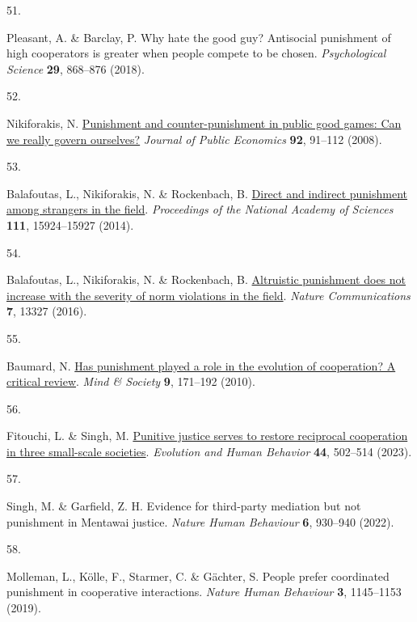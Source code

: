 \documentclass[
  man,floatsintext]{apa6}
\newlength{\cslhangindent}
\newlength{\csllabelwidth}
\newlength{\cslentryspacingunit} %
\newenvironment{CSLReferences}[2] %
 {%
  \setlength{\parindent}{0pt}
  \ifodd #1
  \let\oldpar\par
  \def\par{\hangindent=\cslhangindent\oldpar}
  \fi
  \setlength{\parskip}{#2\cslentryspacingunit}
 }%
 {}
\newcommand{\CSLLeftMargin}[1]{\parbox[t]{\csllabelwidth}{#1}}
\newcommand{\CSLRightInline}[1]{\parbox[t]{\linewidth - \csllabelwidth}{#1}\break}
\begin{document}
\begin{CSLReferences}{0}{0}
\leavevmode{}%
\CSLLeftMargin{51. }%
\CSLRightInline{Pleasant, A. \& Barclay, P. Why hate the good guy? Antisocial punishment of high cooperators is greater when people compete to be chosen. \emph{Psychological Science} \textbf{29}, 868--876 (2018).}

\leavevmode{}%
\CSLLeftMargin{52. }%
\CSLRightInline{Nikiforakis, N. \href{https://doi.org/10.1016/j.jpubeco.2007.04.008}{Punishment and counter-punishment in public good games: Can we really govern ourselves?} \emph{Journal of Public Economics} \textbf{92}, 91--112 (2008).}

\leavevmode{}%
\CSLLeftMargin{53. }%
\CSLRightInline{Balafoutas, L., Nikiforakis, N. \& Rockenbach, B. \href{https://doi.org/10.1073/pnas.1413170111}{Direct and indirect punishment among strangers in the field}. \emph{Proceedings of the National Academy of Sciences} \textbf{111}, 15924--15927 (2014).}

\leavevmode{}%
\CSLLeftMargin{54. }%
\CSLRightInline{Balafoutas, L., Nikiforakis, N. \& Rockenbach, B. \href{https://doi.org/10.1038/ncomms13327}{Altruistic punishment does not increase with the severity of norm violations in the field}. \emph{Nature Communications} \textbf{7}, 13327 (2016).}

\leavevmode{}%
\CSLLeftMargin{55. }%
\CSLRightInline{Baumard, N. \href{https://doi.org/10.1007/s11299-010-0079-9}{Has punishment played a role in the evolution of cooperation? A critical review}. \emph{Mind \& Society} \textbf{9}, 171--192 (2010).}

\leavevmode{}%
\CSLLeftMargin{56. }%
\CSLRightInline{Fitouchi, L. \& Singh, M. \href{https://doi.org/10.1016/j.evolhumbehav.2023.03.001}{Punitive justice serves to restore reciprocal cooperation in three small-scale societies}. \emph{Evolution and Human Behavior} \textbf{44}, 502--514 (2023).}

\leavevmode{}%
\CSLLeftMargin{57. }%
\CSLRightInline{Singh, M. \& Garfield, Z. H. Evidence for third-party mediation but not punishment in {M}entawai justice. \emph{Nature Human Behaviour} \textbf{6}, 930--940 (2022).}

\leavevmode{}%
\CSLLeftMargin{58. }%
\CSLRightInline{Molleman, L., Kölle, F., Starmer, C. \& Gächter, S. People prefer coordinated punishment in cooperative interactions. \emph{Nature Human Behaviour} \textbf{3}, 1145--1153 (2019).}


\end{CSLReferences}
\end{document}
